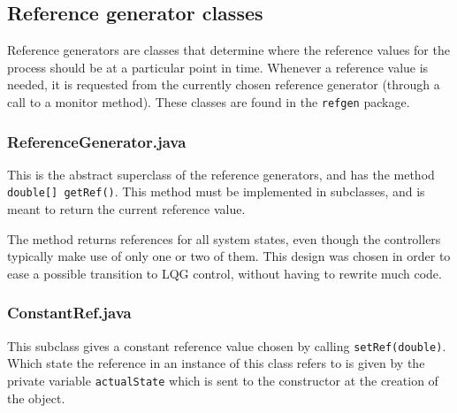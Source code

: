 






\subsection{Reference generator classes}
Reference generators are classes that determine where the reference values for the process should be at a particular point in time. 
Whenever a reference value is needed, it is requested from the currently chosen reference generator  (through a call to a monitor method). 
These classes are found in the \texttt{refgen} package.
 
\subsubsection{ReferenceGenerator.java}
This is the abstract superclass of the reference generators, and has the method \texttt{double[] getRef()}.
This method must be implemented in subclasses, and is meant to return the current reference value.

The method returns references for all system states, even though the controllers typically make use of only one or two of them.
This design was chosen in order to ease a possible transition to LQG control, without having to rewrite much code.

\subsubsection{ConstantRef.java}
This subclass gives a constant reference value chosen by calling \texttt{setRef(double)}. 
Which state the reference in an instance of this class refers to is given by the private variable \texttt{actualState} which is sent to the constructor at the creation of the object.

%

